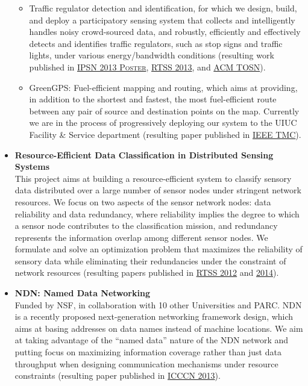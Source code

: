 \begin{itemize}
\begin{itemize}
\item Traffic regulator detection and identification, for which we design, build, and deploy a participatory sensing system that collects and intelligently handles noisy crowd-sourced data, and robustly, efficiently and effectively detects and identifies traffic regulators, such as stop signs and traffic lights, under various energy/bandwidth conditions (resulting work published in \hyperlink{hu2013ipsn}{\textsc{IPSN 2013 Poster}}, \hyperlink{wang2013rtss}{\textsc{RTSS 2013}}, and \hyperlink{hu2015tosn}{\textsc{ACM TOSN}}).

\item GreenGPS: Fuel-efficient mapping and routing, which aims at providing, in addition to the shortest and fastest, the most fuel-efficient route between any pair of source and destination points on the map. Currently we are in the process of progressively deploying our system to the UIUC Facility \& Service department (resulting paper published in \hyperlink{saremi2015tmc}{\textsc{IEEE TMC}}).
\end{itemize}

\item \textbf{Resource-Efficient Data Classification in Distributed Sensing Systems} \\
This project aims at building a resource-efficient system to classify sensory data distributed over a large number of sensor nodes under stringent network resources. We focus on two aspects of the sensor network nodes: data reliability and data redundancy, where reliability implies the degree to which a sensor node contributes to the classification mission, and redundancy represents the information overlap among different sensor nodes. We formulate and solve an optimization problem that maximizes the reliability of sensory data while eliminating their redundancies under the constraint of network resources (resulting papers published in \hyperlink{su2012rtss}{\textsc{RTSS 2012}} and \hyperlink{su2014rtss}{\textsc{2014}}).

\item \textbf{NDN: Named Data Networking} \\
Funded by NSF, in collaboration with 10 other Universities and PARC. NDN is a recently proposed next-generation networking framework design, which aims at basing addresses on data names instead of machine locations. We aim at taking advantage of the ``named data'' nature of the NDN network and putting focus on maximizing information coverage rather than just data throughput when designing communication mechanisms under resource constraints (resulting paper published in \hyperlink{wang2013icccn}{\textsc{ICCCN 2013}}).

\end{itemize}

